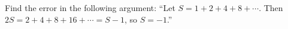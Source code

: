 Find the error in the following argument: ``Let $S=1+2+4+8+\cdots$. Then $2S=2+4+8+16+\cdots=S-1$, so $S=-1$.''\,
